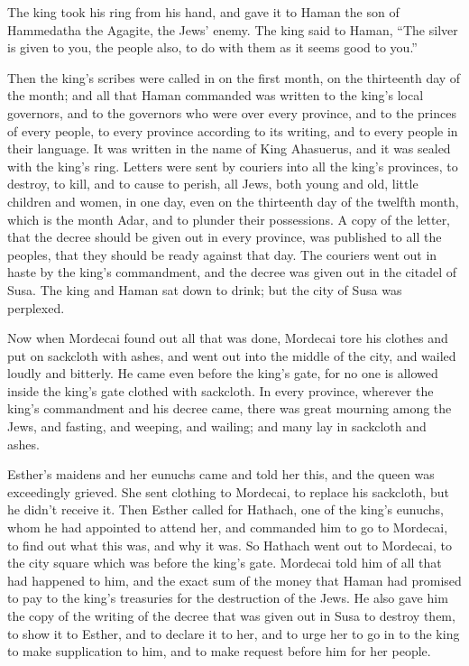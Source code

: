 \myverse{}The king took his ring from his hand, and gave it to Haman the
son of Hammedatha the Agagite, the Jews’ enemy.
\myverse{}The king said to Haman, “The silver is given to you, the people also, to do
with them as it seems good to you.”

\myverse{}Then the king’s scribes were called in on the first month, on
the thirteenth day of the month; and all that Haman commanded was written to the king’s local governors,
and to the governors who were over every province, and to the princes of every people, to every province
according to its writing, and to every people in their language. It was written in the name of King Ahasuerus,
and it was sealed with the king’s ring.
\myverse{}Letters were sent by couriers into all the king’s provinces, to destroy, to
kill, and to cause to perish, all Jews, both young and old, little children and women, in one day, even
on the thirteenth day of the twelfth month, which is the month Adar, and to plunder their possessions.
\myverse{}A copy of the letter, that the decree should be given out in every province,
was published to all the peoples, that they should be ready against that day.
\myverse{}The couriers went out in haste by the king’s commandment, and the decree was
given out in the citadel of Susa. The king and Haman sat down to drink; but the city of Susa was perplexed.


\mychapter{}\myverse*{}Now when Mordecai found out all that was done, Mordecai tore his
clothes and put on sackcloth with ashes, and went out into the middle of the city, and wailed loudly and
bitterly.
\myverse{}He came even before the king’s gate, for no one is allowed inside the king’s
gate clothed with sackcloth.
\myverse{}In every province, wherever the king’s commandment and his decree came, there
was great mourning among the Jews, and fasting, and weeping, and wailing; and many lay in sackcloth and
ashes.

\myverse{}Esther’s maidens and her eunuchs came and told her this, and the
queen was exceedingly grieved. She sent clothing to Mordecai, to replace his sackcloth, but he didn’t
receive it.
\myverse{}Then Esther called for Hathach, one of the king’s eunuchs, whom he had appointed
to attend her, and commanded him to go to Mordecai, to find out what this was, and why it was.
\myverse{}So Hathach went out to Mordecai, to the city square which was before the king’s
gate.
\myverse{}Mordecai told him of all that had happened to him, and the exact sum of the
money that Haman had promised to pay to the king’s treasuries for the destruction of the Jews.
\myverse{}He also gave him the copy of the writing of the decree that was given out in
Susa to destroy them, to show it to Esther, and to declare it to her, and to urge her to go in to the
king to make supplication to him, and to make request before him for her people.

